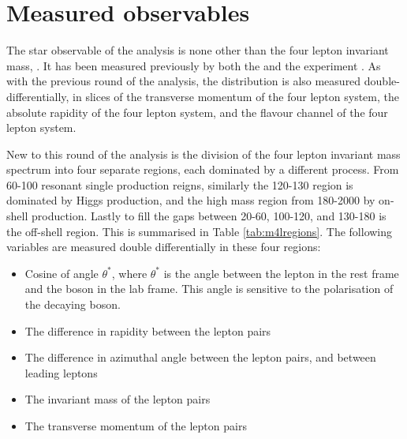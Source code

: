 
\section{Measured observables}

The star observable of the analysis is none other than the four lepton invariant mass, \mFourL. It has been measured previously by both the \ATLAS and the \CMS experiment  \cite{}. As with the previous round of the analysis, the \mFourL distribution is also measured double-differentially, in slices of the transverse momentum of the four lepton system, the absolute rapidity of the four lepton system, and the flavour channel of the four lepton system. 

New to this round of the analysis is the division of the four lepton invariant mass spectrum into four separate regions, each dominated by a different process. From \unit{60}{\GeV}-\unit{100}{\GeV} resonant single \Z production reigns, similarly the \unit{120}{\GeV}-\unit{130}{\GeV} region is dominated by Higgs production, and the high mass region from \unit{180}{\GeV}-\unit{2000}{\GeV} by on-shell \ZZ production. Lastly to fill the gaps between  \unit{20}{\GeV}-\unit{60}{\GeV}, \unit{100}{\GeV}-\unit{120}{\GeV}, and \unit{130}{\GeV}-\unit{180}{\GeV} is the off-shell \ZZ region. This is summarised in Table \ref{tab:m4lregions}. The following variables are measured double differentially in these four regions:

\begin{itemize}
    \item Cosine of angle $\theta^{*}$, where $\theta^{*}$ is the angle between the  lepton in the rest frame and the \Z boson in the lab frame. This angle is sensitive to the polarisation of the decaying boson.
    \item The difference in rapidity between the lepton pairs
    \item The difference in azimuthal angle between the lepton pairs, and between leading leptons
    \item The invariant mass of the lepton pairs
    \item The transverse momentum of the lepton pairs
\end{itemize}


